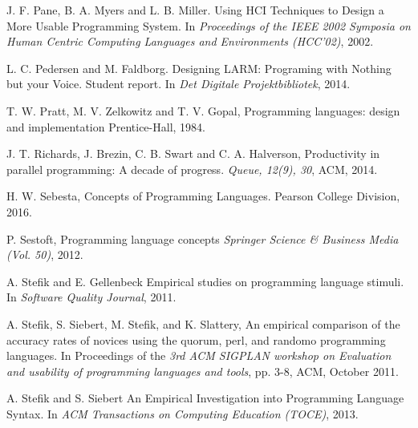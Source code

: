 \documentclass[10pt]{sigplanconf}
\begin{document}
\begin{thebibliography}{}
J. F. Pane, B. A. Myers and L. B. Miller. \newblock Using HCI Techniques to Design a More Usable Programming System. \newblock In \emph{Proceedings of the IEEE 2002 Symposia on Human Centric Computing Languages and Environments (HCC’02)}, 2002.

L. C. Pedersen and M. Faldborg. \newblock Designing LARM: Programing with Nothing but your Voice. \newblock Student report. In \emph{Det Digitale Projektbibliotek}, 2014.

T. W. Pratt, M. V. Zelkowitz and T. V.  Gopal, \newblock Programming languages: design and implementation \newblock Prentice-Hall, 1984.

J. T. Richards, J.  Brezin, C. B. Swart and C. A. Halverson, \newblock Productivity in parallel programming: A decade of progress. \newblock \emph{Queue, 12(9), 30}, ACM, 2014.

H. W. Sebesta, \newblock Concepts of Programming Languages. \newblock Pearson College Division, 2016.

P. Sestoft, \newblock Programming language concepts  \newblock \emph{Springer Science \& Business Media (Vol. 50)}, 2012.

A. Stefik and E. Gellenbeck \newblock Empirical studies on programming language stimuli. \newblock In \emph{Software Quality Journal}, 2011.

A. Stefik, S. Siebert, M. Stefik, and K. Slattery, \newblock An empirical comparison of the accuracy rates of novices using the quorum, perl, and randomo programming languages. \newblock In Proceedings of the \emph{3rd ACM SIGPLAN workshop on Evaluation and usability of programming languages and tools}, pp. 3-8, ACM, October 2011.

A. Stefik and S. Siebert \newblock An Empirical Investigation into Programming Language Syntax. \newblock In \emph{ACM Transactions on Computing Education (TOCE)}, 2013.


\end{thebibliography}
\end{document}
